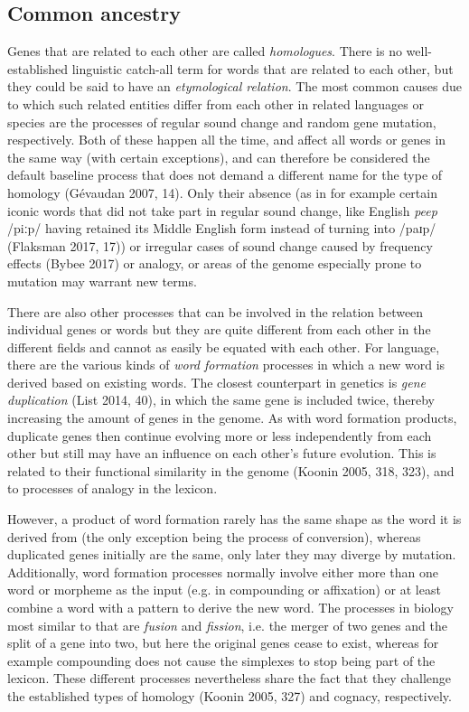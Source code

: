 \documentclass[
  a4paper,
  14pt,
  oneside,
  tablecaptionabove
]{scrbook}
\begin{document}
\subsection*{Common ancestry}

Genes that are related to each other are called \emph{homologues}.
There is no well-established linguistic catch-all term for words that are related to each other,
but they could be said to have an \emph{etymological relation}. The most common causes due to which such related entities differ from each other in related languages or species are the processes of regular sound change and random gene mutation, respectively. Both of these happen all the time, and affect all words or genes in the same way (with certain exceptions), and can therefore be considered the default baseline process that does not demand a different name for the type of homology (Gévaudan 2007, 14). Only their absence (as in for example certain iconic words
that did not take part in regular sound change, like English \emph{peep} /piːp/ having retained its Middle English form instead of turning into /paɪp/ (Flaksman 2017, 17)) or irregular cases of sound change caused by frequency effects (Bybee 2017) or analogy, or areas of the genome especially prone to mutation may warrant new terms.

There are also other processes that can be involved in the relation between individual genes or words
but they are quite different from each other in the different fields and cannot as easily be equated
with each other. For language, there are the various kinds of \emph{word formation}
processes in which a new word is derived based on existing words. The closest counterpart in genetics
is \emph{gene duplication} (List 2014, 40), in which the same gene is included twice, thereby increasing the amount of genes in the genome. As with word formation products, duplicate genes then continue evolving more or less independently from each other but still may have an influence on each other’s future evolution. This is related to their functional similarity in the genome (Koonin 2005, 318, 323), and to processes of analogy in the lexicon.

However, a product of word formation rarely has the same shape as the word it is derived from (the only exception being the process of conversion), whereas duplicated genes initially are the same, only later they may diverge by mutation. Additionally, word formation processes normally involve either more than one word or morpheme as the input (e.g. in compounding or affixation) or at least combine a word with a pattern to derive the new word. The processes in biology most similar to that are
\emph{fusion} and \emph{fission}, i.e. the merger of two genes and the split of a gene into two, but here the original genes cease to exist, whereas for example compounding does not cause the simplexes to stop being part of the lexicon. These different processes nevertheless share the fact that they challenge the established types of homology (Koonin 2005, 327) and cognacy, respectively.
\end{document}
